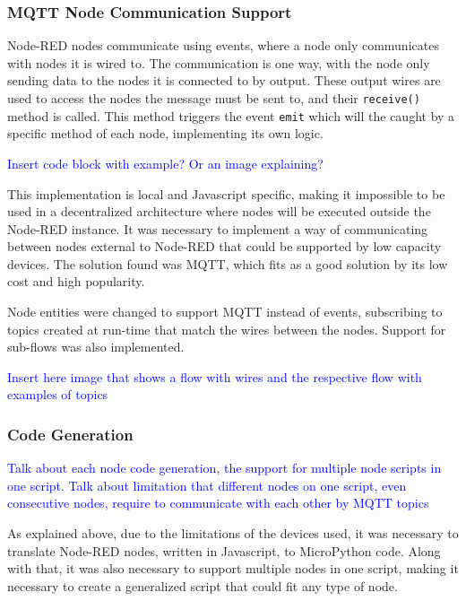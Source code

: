 \subsubsection{MQTT Node Communication Support}\label{sec:mqtt_support}

Node-RED nodes communicate using events, where a node only communicates with nodes it is wired to. The communication is one way, with the node only sending data to the nodes it is connected to by output. These output wires are used to access the nodes the message must be sent to, and their \texttt{receive()} method is called. This method triggers the event \texttt{emit} which will the caught by a specific method of each node, implementing its own logic.

\textcolor{blue}{Insert code block with example? Or an image explaining?}

This implementation is local and Javascript specific, making it impossible to be used in a decentralized architecture where nodes will be executed outside the Node-RED instance. It was necessary to implement a way of communicating between nodes external to Node-RED that could be supported by low capacity devices. The solution found was MQTT, which fits as a good solution by its low cost and high popularity.

Node entities were changed to support MQTT instead of events, subscribing to topics created at run-time that match the wires between the nodes. Support for sub-flows was also implemented.

\textcolor{blue}{Insert here image that shows a flow with wires and the respective flow with examples of topics}

\subsubsection{Code Generation}\label{sec:code_generation}

\textcolor{blue}{Talk about each node code generation, the support for multiple node scripts in one script. Talk about limitation that different nodes on one script, even consecutive nodes, require to communicate with each other by MQTT topics}

As explained above, due to the limitations of the devices used, it was necessary to translate Node-RED nodes, written in Javascript, to MicroPython code. Along with that, it was also necessary to support multiple nodes in one script, making it necessary to create a generalized script that could fit any type of node.


